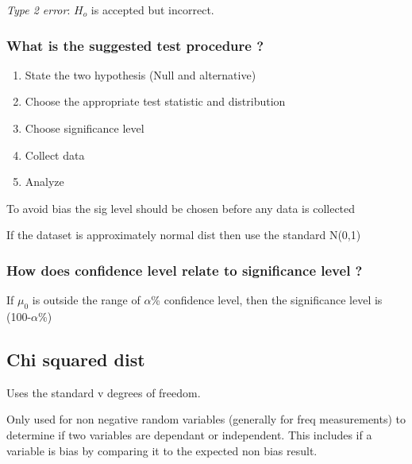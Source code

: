 \documentclass[
]{article}
\providecommand{\tightlist}{%
  \setlength{\itemsep}{0pt}\setlength{\parskip}{0pt}}
\begin{document}
\emph{Type 2 error}: \(H_o\) is accepted but incorrect.

\hypertarget{what-is-the-suggested-test-procedure}{%
\subsubsection{What is the suggested test procedure
?}\label{what-is-the-suggested-test-procedure}}

\begin{enumerate}
\def\labelenumi{\arabic{enumi}.}
\tightlist
\item
  State the two hypothesis (Null and alternative)
\item
  Choose the appropriate test statistic and distribution
\item
  Choose significance level
\item
  Collect data
\item
  Analyze
\end{enumerate}

To avoid bias the sig level should be chosen before any data is
collected

If the dataset is approximately normal dist then use the standard N(0,1)

\hypertarget{how-does-confidence-level-relate-to-significance-level}{%
\subsubsection{How does confidence level relate to significance level
?}\label{how-does-confidence-level-relate-to-significance-level}}

If \(\mu_0\) is outside the range of \(\alpha\)\% confidence level, then
the significance level is (100-\(\alpha\)\%)

\hypertarget{chi-squared-dist}{%
\subsection{Chi squared dist}\label{chi-squared-dist}}

Uses the standard v degrees of freedom.

Only used for non negative random variables (generally for freq
measurements) to determine if two variables are dependant or
independent. This includes if a variable is bias by comparing it to the
expected non bias result.
\end{document}
